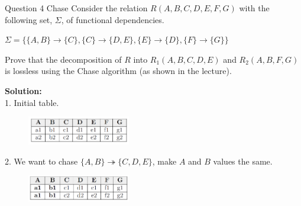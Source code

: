 \begin{frame}[fragile]{Question 4 Chase}
	Consider the relation $R(A,B,C,D,E,F,G)$ with the following set, $\Sigma$, of functional dependencies.\\ \vspace{5pt}
	
	$\Sigma=\{\{A,B\}\rightarrow\{C\},\{C\}\rightarrow\{D,E\},\{E\}\rightarrow\{D\},\{F\}\rightarrow\{G\}\}$\\ \vspace{5pt}
	
	Prove that the decomposition of $R$ into $R_1(A,B,C,D,E)$ and $R_2(A,B,F,G)$ is lossless using the Chase algorithm (as shown in the lecture).\\ \vspace{5pt}
	
	\textbf{Solution:}\\ \vspace{2pt}
	1. Initial table.\\
	\begin{figure}
		\includegraphics[width=0.4\textwidth, trim=0 0 0 0, clip]{4221-t5/images/4-1.png}
	\end{figure}
	
	2. We want to chase $\{A,B\} \twoheadrightarrow \{C,D,E\}$, make $A$ and $B$ values the same.\\
	\begin{figure}
		\includegraphics[width=0.4\textwidth, trim=0 0 0 0, clip]{4221-t5/images/4-2.png}
	\end{figure}	
\end{frame}

